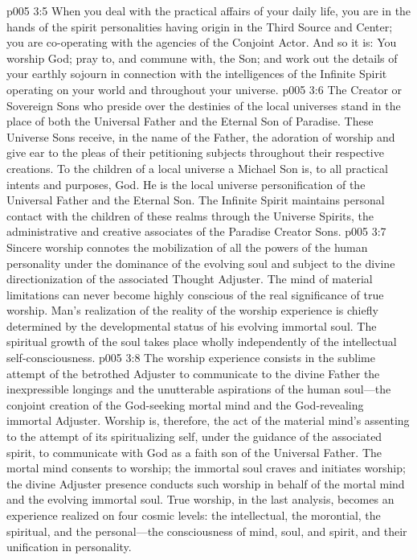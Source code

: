 \vs p005 3:5 When you deal with the practical affairs of your daily life, you are in the hands of the spirit personalities having origin in the Third Source and Center; you are co\hyp{}operating with the agencies of the Conjoint Actor. And so it is: You worship God; pray to, and commune with, the Son; and work out the details of your earthly sojourn in connection with the intelligences of the Infinite Spirit operating on your world and throughout your universe.
\pc \vs p005 3:6 The Creator or Sovereign Sons who preside over the destinies of the local universes stand in the place of both the Universal Father and the Eternal Son of Paradise. These Universe Sons receive, in the name of the Father, the adoration of worship and give ear to the pleas of their petitioning subjects throughout their respective creations. To the children of a local universe a Michael Son is, to all practical intents and purposes, God. He is the local universe personification of the Universal Father and the Eternal Son. The Infinite Spirit maintains personal contact with the children of these realms through the Universe Spirits, the administrative and creative associates of the Paradise Creator Sons.
\pc \vs p005 3:7 Sincere worship connotes the mobilization of all the powers of the human personality under the dominance of the evolving soul and subject to the divine directionization of the associated Thought Adjuster. The mind of material limitations can never become highly conscious of the real significance of true worship. Man’s realization of the reality of the worship experience is chiefly determined by the developmental status of his evolving immortal soul. The spiritual growth of the soul takes place wholly independently of the intellectual self\hyp{}consciousness.
\vs p005 3:8 The worship experience consists in the sublime attempt of the betrothed Adjuster to communicate to the divine Father the inexpressible longings and the unutterable aspirations of the human soul---the conjoint creation of the God\hyp{}seeking mortal mind and the God\hyp{}revealing immortal Adjuster. Worship is, therefore, the act of the material mind’s assenting to the attempt of its spiritualizing self, under the guidance of the associated spirit, to communicate with God as a faith son of the Universal Father. The mortal mind consents to worship; the immortal soul craves and initiates worship; the divine Adjuster presence conducts such worship in behalf of the mortal mind and the evolving immortal soul. True worship, in the last analysis, becomes an experience realized on four cosmic levels: the intellectual, the morontial, the spiritual, and the personal---the consciousness of mind, soul, and spirit, and their unification in personality.\plusone

